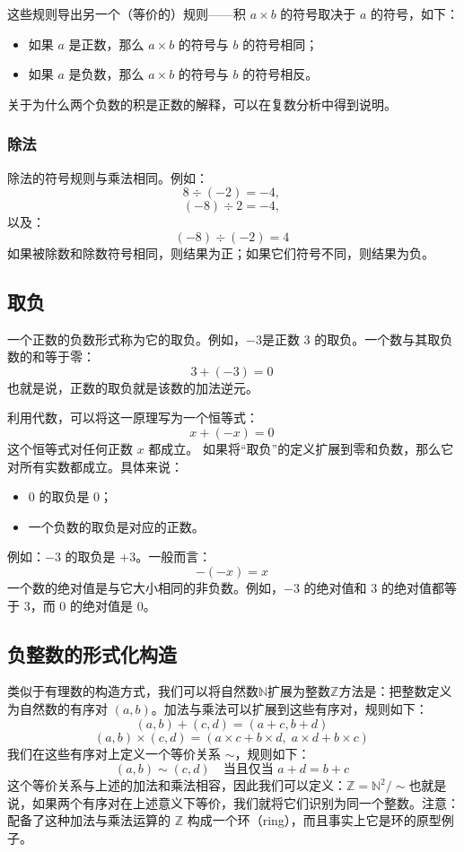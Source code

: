 这些规则导出另一个（等价的）规则——积 $a \times b$ 的符号取决于 $a$ 的符号，如下：
\begin{itemize}
\item 如果 $a$ 是正数，那么 $a \times b$ 的符号与 $b$ 的符号相同；
\item 如果 $a$ 是负数，那么 $a \times b$ 的符号与 $b$ 的符号相反。
\end{itemize}
关于为什么两个负数的积是正数的解释，可以在复数分析中得到说明。
\subsubsection{除法}
除法的符号规则与乘法相同。例如：
$$
8 \div  (-2) = -4,~
$$
$$
(-8) \div 2 = -4,~
$$
以及：
$$
(-8) \div (-2) = 4~
$$
如果被除数和除数符号相同，则结果为正；如果它们符号不同，则结果为负。
\subsection{取负}
一个正数的负数形式称为它的取负。例如，$-3$是正数 3 的取负。一个数与其取负数的和等于零：
$$
3 + (-3) = 0~
$$
也就是说，正数的取负就是该数的加法逆元。

利用代数，可以将这一原理写为一个恒等式：
$$
x + (-x) = 0~
$$
这个恒等式对任何正数 $x$ 都成立。
如果将“取负”的定义扩展到零和负数，那么它对所有实数都成立。具体来说：
\begin{itemize}
\item 0 的取负是 0；
\item 一个负数的取负是对应的正数。
\end{itemize}
例如：$-3$ 的取负是 $+3$。一般而言：
$$
-(-x) = x~
$$
一个数的绝对值是与它大小相同的非负数。例如，$-3$ 的绝对值和 $3$ 的绝对值都等于 3，而 $0$ 的绝对值是 0。
\subsection{负整数的形式化构造}
类似于有理数的构造方式，我们可以将自然数$\mathbb{N}$扩展为整数$\mathbb{Z}$方法是：把整数定义为自然数的有序对 $(a, b)$。加法与乘法可以扩展到这些有序对，规则如下：
$$
(a, b) + (c, d) = (a + c, b + d)~
$$
$$
(a, b) \times (c, d) = (a \times c + b \times d, \; a \times d + b \times c)~
$$
我们在这些有序对上定义一个等价关系 $\sim$，规则如下：
$$
(a, b) \sim (c, d) \quad \text{当且仅当 } a + d = b + c~
$$
这个等价关系与上述的加法和乘法相容，因此我们可以定义：$\mathbb{Z} = \mathbb{N}^2 / \sim$也就是说，如果两个有序对在上述意义下等价，我们就将它们识别为同一个整数。注意：配备了这种加法与乘法运算的 $\mathbb{Z}$ 构成一个环（ring），而且事实上它是环的原型例子。

